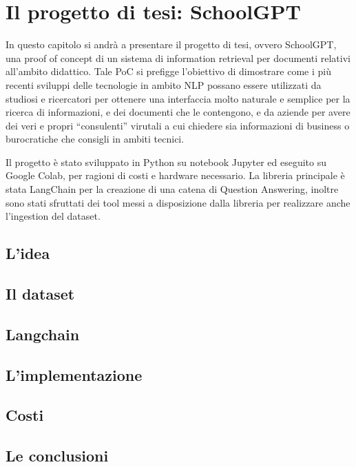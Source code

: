\chapter{Il progetto di tesi: SchoolGPT}
In questo capitolo si andrà a presentare il progetto di tesi, ovvero SchoolGPT, una proof of concept di un sistema di information retrieval per documenti relativi all'ambito didattico.
Tale PoC si prefigge l'obiettivo di dimostrare come i più recenti sviluppi delle tecnologie in ambito NLP possano essere utilizzati da studiosi e ricercatori per ottenere una interfaccia molto naturale e semplice per la ricerca di informazioni, e dei documenti che le contengono, e da aziende per avere dei veri e propri ``consulenti'' virutali a cui chiedere sia informazioni di business o burocratiche che consigli in ambiti tecnici. 

Il progetto è stato sviluppato in Python su notebook Jupyter ed eseguito su Google Colab, per ragioni di costi e hardware necessario. 
La libreria principale è stata LangChain per la creazione di una catena di Question Answering, inoltre sono stati sfruttati dei tool messi a disposizione dalla libreria per realizzare anche l'ingestion del dataset.
\section{L'idea}

\section{Il dataset}

\section{Langchain}

\section{L'implementazione}


\section{Costi}

\section{Le conclusioni}

